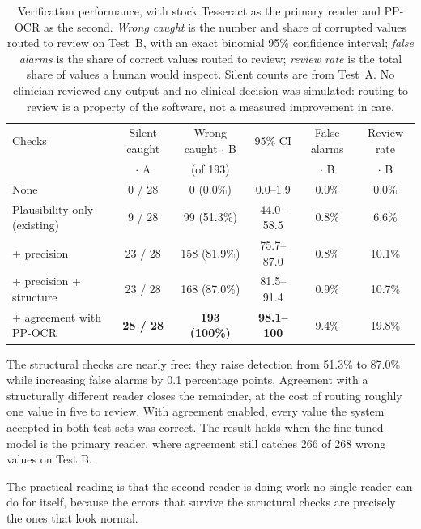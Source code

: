 \documentclass[11pt]{article}
\begin{document}
\begin{table}[t]
\centering
\caption{Verification performance, with stock Tesseract as the primary reader and PP-OCR as the
second. \emph{Wrong caught} is the number and share of corrupted values routed to review on
Test~B, with an exact binomial 95\% confidence interval; \emph{false alarms} is the share of
correct values routed to review; \emph{review rate} is the total share of values a human would
inspect. Silent counts are from Test~A. No clinician reviewed any output and no clinical
decision was simulated: routing to review is a property of the software, not a measured
improvement in care.}
\label{tab:verify}
\small
\begin{tabular}{lccccc}
\toprule
Checks & Silent caught & Wrong caught $\cdot$ B & 95\% CI & False alarms & Review rate \\
       & $\cdot$ A & (of 193) & & $\cdot$ B & $\cdot$ B \\
\midrule
None                              & \phantom{0}0 / 28 & \phantom{00}0 \phantom{0}(0.0\%) & \phantom{0}0.0--1.9 & 0.0\% & \phantom{0}0.0\% \\
Plausibility only (existing)      & \phantom{0}9 / 28 & \phantom{0}99 (51.3\%) & 44.0--58.5 & 0.8\% & \phantom{0}6.6\% \\
\quad + precision                 & 23 / 28 & 158 (81.9\%) & 75.7--87.0 & 0.8\% & 10.1\% \\
\quad + precision + structure     & 23 / 28 & 168 (87.0\%) & 81.5--91.4 & 0.9\% & 10.7\% \\
\quad + agreement with PP-OCR     & \textbf{28 / 28} & \textbf{193 (100\%)} & \textbf{98.1--100} & 9.4\% & 19.8\% \\
\bottomrule
\end{tabular}
\end{table}

The structural checks are nearly free: they raise detection from 51.3\% to 87.0\% while
increasing false alarms by 0.1 percentage points. Agreement with a structurally different reader
closes the remainder, at the cost of routing roughly one value in five to review. With agreement
enabled, every value the system accepted in both test sets was correct. The result holds when
the fine-tuned model is the primary reader, where agreement still catches 266 of 268 wrong
values on Test B.

The practical reading is that the second reader is doing work no single reader can do for
itself, because the errors that survive the structural checks are precisely the ones that look
normal.
\end{document}
